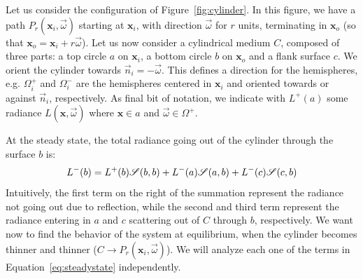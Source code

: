 Let us consider the configuration of Figure~\ref{fig:cylinder}. In this figure, we have a path $P_r(\mathbf{x}_i,\vec{\omega})$ starting at $\mathbf{x}_i$, with direction $\vec{\omega}$ for $r$ units, terminating in $\mathbf{x}_o$ (so that $\mathbf{x}_o = \mathbf{x}_i + r \vec{\omega}$). Let us now consider a cylindrical medium $C$, composed of three parts: a top circle $a$ on $\mathbf{x}_i$, a bottom circle $b$ on $\mathbf{x}_o$ and a flank surface $c$. We orient the cylinder towards $\vec{n}_i = -\vec{\omega}$. This defines a direction for the hemispheres, e.g. $\Omega_i^+$ and $\Omega_i^-$ are the hemispheres centered in $\mathbf{x}_i$  and oriented towards or against $\vec{n}_i$, respectively. As final bit of notation, we indicate with $L^+(a)$ some radiance $L(\mathbf{x}, \vec{\omega})$ where $\mathbf{x} \in a$ and $\vec{\omega} \in \Omega^+$.

At the steady state, the total radiance going out of the cylinder through the surface $b$ is:
\begin{equation}
\label{eq:steadystate}
L^-(b) = L^+(b)\mathscr{S}(b,b) + L^-(a)\mathscr{S}(a,b)  + L^-(c)\mathscr{S}(c,b)
\end{equation}
Intuitively, the first term on the right of the summation represent the radiance not going out due to reflection, while the second and third term represent the radiance entering in $a$ and $c$ scattering out of $C$ through $b$, respectively. We want now to find the behavior of the system at equilibrium, when the cylinder becomes thinner and thinner ($C\rightarrow P_r(\mathbf{x}_i,\vec{\omega})$). We will analyze each one of the terms in Equation~\ref{eq:steadystate} independently. 

